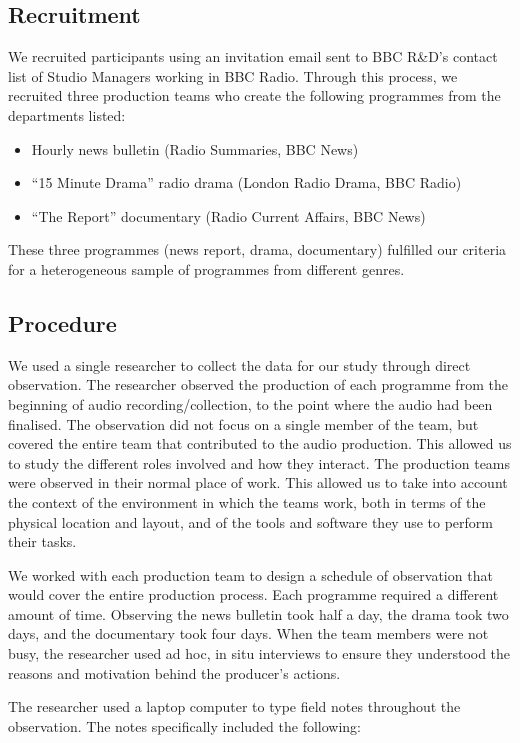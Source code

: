 \subsection{Recruitment}
We recruited participants using an invitation email sent to BBC R\&D's contact list of Studio Managers working in BBC
Radio. Through this process, we recruited three production teams who create the following programmes from the
departments listed:
\begin{itemize}
	\item Hourly news bulletin (Radio Summaries, BBC News)
	\item ``15 Minute Drama'' radio drama (London Radio Drama, BBC Radio)
	\item ``The Report'' documentary (Radio Current Affairs, BBC News)
\end{itemize}

These three programmes (news report, drama, documentary) fulfilled our criteria for a heterogeneous sample of
programmes from different genres.

\subsection{Procedure}
We used a single researcher to collect the data for our study through direct observation. The researcher observed the
production of each programme from the beginning of audio recording/collection, to the point where the audio had been
finalised. The observation did not focus on a single member of the team, but covered the entire team that
contributed to the audio production. This allowed us to study the different roles involved  and how they interact.  The
production teams were observed in their normal place of work. This allowed us to take into account the context of the
environment in which the teams work, both in terms of the physical location and layout, and of the tools and software
they use to perform their tasks.

We worked with each production team to design a schedule of observation that would cover the entire production process.
Each programme required a different amount of time. Observing the news bulletin took half a day, the drama took two
days, and the documentary took four days.  When the team members were not busy, the researcher used ad hoc, in situ
interviews to ensure they understood the reasons and motivation behind the producer's actions.

The researcher used a laptop computer to type field notes throughout the observation.  The notes specifically included
the following:

